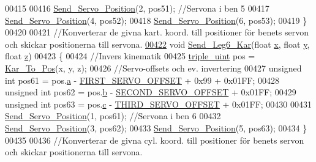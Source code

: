 \begin{DoxyCode}
00415     
00416     \hyperlink{servo___u_a_r_t_8c_a5ed0e49737d1eaf80665c285396b4337}{Send\_Servo\_Position}(2, pos51); \textcolor{comment}{//Servona i ben 5}
00417     \hyperlink{servo___u_a_r_t_8c_a5ed0e49737d1eaf80665c285396b4337}{Send\_Servo\_Position}(4, pos52);
00418     \hyperlink{servo___u_a_r_t_8c_a5ed0e49737d1eaf80665c285396b4337}{Send\_Servo\_Position}(6, pos53);
00419 \}
00420 
00421 \textcolor{comment}{//Konverterar de givna kart. koord. till positioner för benets servon och skickar positionerna till
       servona.}
\hypertarget{servo___u_a_r_t_8c_source.tex_l00422}{}\hyperlink{servo___u_a_r_t_8h_a2178defeed6cf9781991514439dd799b}{00422} \textcolor{keywordtype}{void} \hyperlink{servo___u_a_r_t_8c_ae0ed262924c7685eac16e334f7aa2ea5}{Send\_Leg6\_Kar}(\textcolor{keywordtype}{float} \hyperlink{sensor_8h_a6c4b361d72eb3767ba424ac9a6ecf52b}{x}, \textcolor{keywordtype}{float} \hyperlink{sensor_8h_a0ed6a908288e0cd87f79c1b5ab56d07c}{y}, \textcolor{keywordtype}{float} \hyperlink{over__hinder_8c_af73583b1e980b0aa03f9884812e9fd4d}{z})
00423 \{
00424     \textcolor{comment}{//Invers kinematik}
00425     \hyperlink{structtriple__uint}{triple\_uint} pos = \hyperlink{invers__kinematik_8c_a68f82386196ad991ed54fb9796d90f7c}{Kar\_To\_Pos}(x, y, z);
00426     \textcolor{comment}{//Servo-offsets och ev. invertering  }
00427     \textcolor{keywordtype}{unsigned} \textcolor{keywordtype}{int} pos61 = pos.\hyperlink{structtriple__uint_a0ea8a85723620c90be9fd2a693f12a59}{a} - \hyperlink{servo___u_a_r_t_8c_a4c437d01d2f060ec86c16ed5e76efe45}{FIRST\_SERVO\_OFFSET} + 0x99 + 0x01FF;
00428     \textcolor{keywordtype}{unsigned} \textcolor{keywordtype}{int} pos62 = pos.\hyperlink{structtriple__uint_a790d5baa17ec7aaf7bb49750a16e9c29}{b} - \hyperlink{servo___u_a_r_t_8c_acb02dedbe5ff19694bdb5b2ddf61664a}{SECOND\_SERVO\_OFFSET} + 0x01FF;
00429     \textcolor{keywordtype}{unsigned} \textcolor{keywordtype}{int} pos63 = pos.\hyperlink{structtriple__uint_a6ce17b018c47d0f1d0e53a458f741ad3}{c} - \hyperlink{servo___u_a_r_t_8c_ac2f065c44b617c91ea7f4237e8ead729}{THIRD\_SERVO\_OFFSET} + 0x01FF;
00430     
00431     \hyperlink{servo___u_a_r_t_8c_a5ed0e49737d1eaf80665c285396b4337}{Send\_Servo\_Position}(1, pos61); \textcolor{comment}{//Servona i ben 6}
00432     \hyperlink{servo___u_a_r_t_8c_a5ed0e49737d1eaf80665c285396b4337}{Send\_Servo\_Position}(3, pos62);
00433     \hyperlink{servo___u_a_r_t_8c_a5ed0e49737d1eaf80665c285396b4337}{Send\_Servo\_Position}(5, pos63);
00434 \}
00435 
00436 \textcolor{comment}{//Konverterar de givna cyl. koord. till positioner för benets servon och skickar positionerna till servona.}

\end{DoxyCode}
